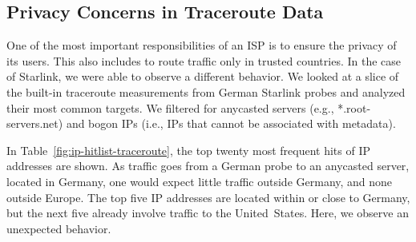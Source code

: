 \subsection{Privacy Concerns in Traceroute Data}

One of the most important responsibilities of an \ac{ISP} is to ensure the privacy of its users. This also includes to route traffic only in trusted countries. In the case of Starlink, we were able to observe a different behavior. We looked at a slice of the built-in traceroute measurements from German Starlink probes and analyzed their most common targets. We filtered for anycasted servers (e.g., *.root-servers.net) and bogon IPs (i.e., IPs that cannot be associated with metadata).



In Table~\ref{fig:ip-hitlist-traceroute}, the top twenty most frequent hits of IP addresses are shown. As traffic goes from a German probe to an anycasted server, located in Germany, one would expect little traffic outside Germany, and none outside Europe. The top five IP addresses are located within or close to Germany, but the next five already involve traffic to the United~States. Here, we observe an unexpected behavior.



